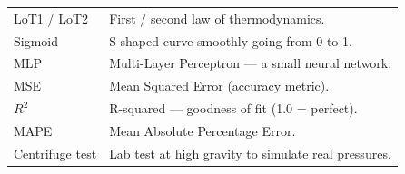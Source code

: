\documentclass[11pt,a4paper]{article}
\begin{document}
\begin{center}
\begin{tabular}{lp{9.5cm}}
LoT1 / LoT2 & First / second law of thermodynamics. \\
Sigmoid & S-shaped curve smoothly going from 0 to 1. \\
MLP & Multi-Layer Perceptron --- a small neural network. \\
MSE & Mean Squared Error (accuracy metric). \\
$R^2$ & R-squared --- goodness of fit (1.0 = perfect). \\
MAPE & Mean Absolute Percentage Error. \\
Centrifuge test & Lab test at high gravity to simulate real pressures. \\
\bottomrule
\end{tabular}
\end{center}
\end{document}
